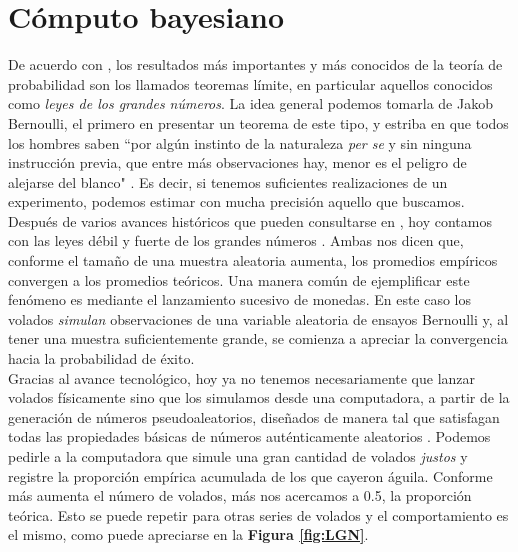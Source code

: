 \chapter{Cómputo bayesiano} \label{chap:Cap_MCMC}

De acuerdo con \textcite{Ross10}, los resultados más importantes y más conocidos de la teoría de probabilidad son los llamados teoremas límite, en particular aquellos conocidos como \textit{leyes de los grandes números}. La idea general podemos tomarla de Jakob Bernoulli, el primero en presentar un teorema de este tipo, y estriba en que todos los hombres saben ``por algún instinto de la naturaleza \textit{per se} y sin ninguna instrucción previa, que entre más observaciones hay, menor es el peligro de alejarse del blanco" \parencite{Pulskamp09}. Es decir, si tenemos suficientes realizaciones de un experimento, podemos estimar con mucha precisión aquello que buscamos.\\

Después de varios avances históricos que pueden consultarse en \textcite{Seneta13}, hoy contamos con las leyes débil y fuerte de los grandes números \parencite{Ross10}. Ambas nos dicen que, conforme el tamaño de una muestra aleatoria aumenta, los promedios empíricos convergen a los promedios teóricos. Una manera común de ejemplificar este fenómeno es mediante el lanzamiento sucesivo de monedas. En este caso los volados \textit{simulan} observaciones de una variable aleatoria de ensayos Bernoulli y, al tener una muestra suficientemente grande, se comienza a apreciar la convergencia hacia la probabilidad de éxito.\\ 

Gracias al avance tecnológico, hoy ya no tenemos necesariamente que lanzar volados físicamente sino que los simulamos desde una computadora, a partir de la generación de números pseudoaleatorios, diseñados de manera tal que satisfagan todas las propiedades básicas de números auténticamente aleatorios \parencite{Ross13}. Podemos pedirle a la computadora que simule una gran cantidad de volados \textit{justos} y registre la proporción empírica acumulada de los que cayeron águila. Conforme más aumenta el número de volados, más nos acercamos a 0.5, la proporción teórica. Esto se puede repetir para otras series de volados y el comportamiento es el mismo, como puede apreciarse en la \textbf{Figura \ref{fig:LGN}}. \\


